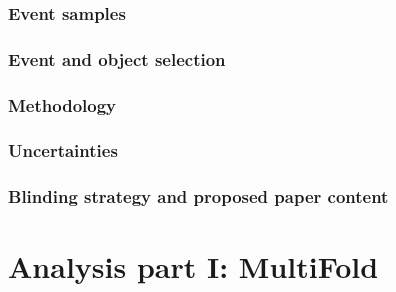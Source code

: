 \documentclass[NOTE, atlasdraft=true, texlive=2016, UKenglish]{\ATLASLATEXPATH atlasdoc}
\begin{document}
\maketitle

\tableofcontents


\clearpage


\section{Event samples}
\label{sec:samples}


\section{Event and object selection}
\label{sec:objects}

\newpage


\section{Methodology}
\label{sec:strategy}



\clearpage

\section{Uncertainties}
\label{sec:uncerts}



\section{Blinding strategy and proposed paper content}


\clearpage

\part{Analysis part I: MultiFold}
\label{part:multifold}
\end{document}
